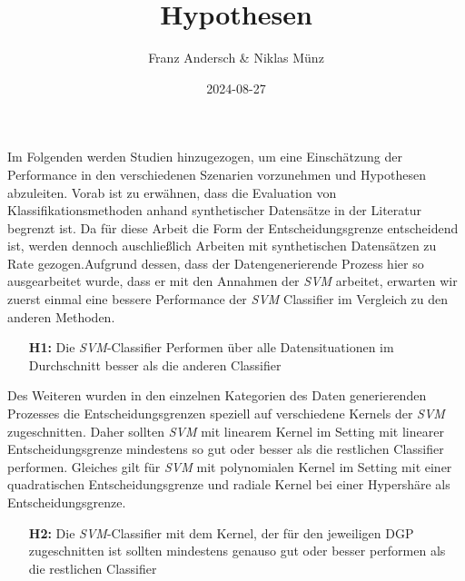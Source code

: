 \documentclass[
]{article}
\title{Hypothesen}
\author{Franz Andersch \& Niklas Münz}
\date{2024-08-27}
\renewcommand{\maketitle}{}
\begin{document}
\maketitle

Im Folgenden werden Studien hinzugezogen, um eine Einschätzung der
Performance in den verschiedenen Szenarien vorzunehmen und Hypothesen
abzuleiten. Vorab ist zu erwähnen, dass die Evaluation von
Klassifikationsmethoden anhand synthetischer Datensätze in der Literatur
begrenzt ist. Da für diese Arbeit die Form der Entscheidungsgrenze
entscheidend ist, werden dennoch auschließlich Arbeiten mit
synthetischen Datensätzen zu Rate gezogen.\newline Aufgrund dessen, dass
der Datengenerierende Prozess hier so ausgearbeitet wurde, dass er mit
den Annahmen der \textit{SVM} arbeitet, erwarten wir zuerst einmal eine
bessere Performance der \textit{SVM} Classifier im Vergleich zu den
anderen Methoden.

\begin{minipage}{0.9\linewidth}
\begin{itemize}[leftmargin=0.1\linewidth]
\item[\textbf{H1:}] Die \textit{SVM}-Classifier Performen über alle Datensituationen im Durchschnitt besser als die anderen Classifier
\end{itemize}
\end{minipage}

Des Weiteren wurden in den einzelnen Kategorien des Daten generierenden
Prozesses die Entscheidungsgrenzen speziell auf verschiedene Kernels der
\textit{SVM} zugeschnitten. Daher sollten \textit{SVM} mit linearem
Kernel im Setting mit linearer Entscheidungsgrenze mindestens so gut
oder besser als die restlichen Classifier performen. Gleiches gilt für
\textit{SVM} mit polynomialen Kernel im Setting mit einer quadratischen
Entscheidungsgrenze und radiale Kernel bei einer Hypershäre als
Entscheidungsgrenze.

\begin{minipage}{0.9\linewidth}
\begin{itemize}[leftmargin=0.1\linewidth]
\item[\textbf{H2:}] Die \textit{SVM}-Classifier mit dem Kernel, der für den jeweiligen DGP zugeschnitten ist sollten mindestens genauso gut oder besser performen als die restlichen Classifier
\end{itemize}
\end{minipage}
\end{document}
